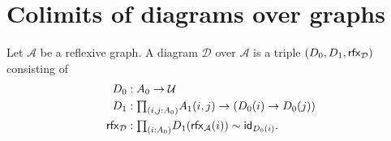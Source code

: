 \begin{comment}
Analogous to \cref{thm:rcoeq_is_pushout}, we show that the typal realization of a $2$-simplicial type $\mathcal{A}$ is simply the homotopy colimit of the diagram
\begin{equation*}
\begin{tikzcd}
& \tilde{A}_2 \arrow[dl] \arrow[d] \arrow[dr] \\
\tilde{A}_1 \arrow[d] & \tilde{A}_1 \arrow[dl] \arrow[dr] & \tilde{A}_1 \arrow[dl,crossing over] \arrow[d] \\
\tilde{A}_0 & \tilde{A}_0 \arrow[from=ul,crossing over] & \tilde{A}_0,
\end{tikzcd}
\end{equation*}
where $\tilde{A}_i$ is the total space of all $i$-cells.
This presentation of the typal realization allows us to compute typal realizations as iterated pushouts.

We will show in \cref{cor:2-pre-kernel} that the typal realization of the $2$-pre-kernel of a map $f:A\to X$ is the triple fiberwise join $\join[X]{A}{\join[X]{A}{A}}$, and we will show in \cref{cor:geom_hspace} that the typal realization of a coherent H-space is the cofiber of the Hopf fibration
\begin{equation*}
\begin{tikzcd}
\join{X}{X} \arrow[r,"\eta_X"] \arrow[d] & \susp X \arrow[d] \\
\unit \arrow[r] & \mathsf{cof}_{\eta_X}.
\end{tikzcd}
\end{equation*}
Of course, in this result we use the coherence of a coherent H-space.

We will also be able to use the material of this chapter to show that the join and smash product are associative operations.
\end{comment}

\section{Colimits of diagrams over graphs}

\begin{defn}
Let $\mathcal{A}$ be a reflexive graph. A diagram $\mathcal{D}$ over $\mathcal{A}$ is a triple $(\pts{D},\edg{D},\rfx{\mathcal{D}})$ consisting of
\begin{align*}
\pts{D} & : \pts{A}\to \UU \\
\edg{D} & : \prd{i,j:\pts{A}} \edg{A}(i,j)\to (\pts{D}(i)\to \pts{D}(j)) \\
\rfx{\mathcal{D}} & : \prd{i:\pts{A}} \edg{D}(\rfx{\mathcal{A}}(i))\htpy \idfunc[\pts{D}(i)].
\end{align*}
\end{defn}

